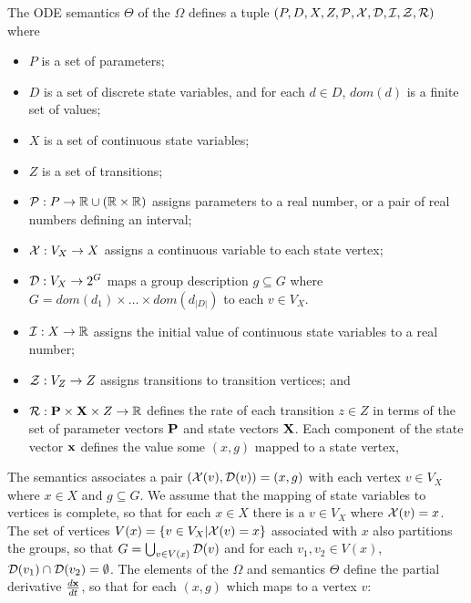 \begin{definition}
	The ODE semantics $\Theta$ of the \Petrinet{} $\Omega$ defines a tuple $(P, D, X,
		Z, {\cal P}, {\cal X}, {\cal D}, {\cal I}, {\cal Z}, {\cal R})$ where
	\begin{itemize}
		\item $P$ is a set of parameters;
		\item $D$ is a set of discrete state variables, and for each $d \in
			      D$, $dom(d)$ is a finite set of values;
		\item $X$ is a set of continuous state variables;
		\item $Z$ is a set of transitions;
		\item ${\cal P}: P \rightarrow {\mathbb{R}} \cup ({\mathbb{R}} \times {\mathbb{R}})$ assigns
		      parameters to a real number, or a pair of real numbers defining an
		      interval;
		\item ${\cal X}: V_X  \rightarrow X$ assigns a
		      continuous variable to each state
		      vertex;
		\item ${\cal D}: V_X \rightarrow 2^{G}$ maps a group description $g
			      \subseteq G$ where $G=dom(d_1) \times \ldots
			      \times dom(d_{|D|})$
		      to each $v \in V_X$.
		\item ${\cal I}: X \rightarrow {\mathbb{R}}$ assigns the initial value of
		      continuous state variables to a real number;
		\item ${\cal Z}: V_Z  \rightarrow Z$ assigns transitions to transition
		      vertices; and
		\item ${\cal R}: {\bf P} \times {\bf X} \times Z \rightarrow {\mathbb{R}}$
		      defines the rate of each transition  $z \in Z$ in terms of the set of
		      parameter vectors ${\bf P}$ and state vectors ${\bf X}$. Each
		      component of the state vector ${\bf x}$ defines the value some $(x, g)$
		      mapped to a state vertex,
	\end{itemize}

	The semantics associates a pair $({\cal X}(v),{\cal D}(v)) = (x, g)$ with each vertex $v \in V_X$ where $x
		\in X$ and $g \subseteq G$.  We assume that the mapping of state variables
	to vertices is complete, so that for each $x \in X$ there is a
	$v \in V_X$ where ${\cal X}(v) = x$.  The set of vertices $V(x)=\{v \in V_X | {\cal
		X}(v) = x\}$ associated with $x$ also partitions the groups, so
	that $G = \bigcup_{v\in V(x)}{\cal D}(v)$ and for each $v_1, v_2 \in V(x)$,
	${\cal D}(v_1)\cap{\cal D}(v_2) = \emptyset$.
	The elements of the \Petrinet{} $\Omega$ and semantics $\Theta$ define the
	partial derivative $\frac{d {\bf x}}{dt}$, so that for each $(x, g)$ which maps to
	a vertex $v$:


\end{definition}
